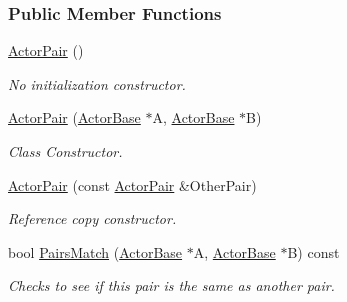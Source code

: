 \subsubsection*{Public Member Functions}
\begin{DoxyCompactItemize}
\item 
\hypertarget{classMezzanine_1_1ActorPair_a3dec652a633a16df9c97bf4a07cfa61d}{
\hyperlink{classMezzanine_1_1ActorPair_a3dec652a633a16df9c97bf4a07cfa61d}{ActorPair} ()}
\label{classMezzanine_1_1ActorPair_a3dec652a633a16df9c97bf4a07cfa61d}

\begin{DoxyCompactList}\small\item\em No initialization constructor. \item\end{DoxyCompactList}\item 
\hyperlink{classMezzanine_1_1ActorPair_a1225e33cabd53c5552ae7817e434080a}{ActorPair} (\hyperlink{classMezzanine_1_1ActorBase}{ActorBase} $\ast$A, \hyperlink{classMezzanine_1_1ActorBase}{ActorBase} $\ast$B)
\begin{DoxyCompactList}\small\item\em Class Constructor. \item\end{DoxyCompactList}\item 
\hyperlink{classMezzanine_1_1ActorPair_a79e10f448a82ff410a61f1d76cdb4edb}{ActorPair} (const \hyperlink{classMezzanine_1_1ActorPair}{ActorPair} \&OtherPair)
\begin{DoxyCompactList}\small\item\em Reference copy constructor. \item\end{DoxyCompactList}\item 
bool \hyperlink{classMezzanine_1_1ActorPair_a1d5f928bd8e88d6cf7be25c79e9fd529}{PairsMatch} (\hyperlink{classMezzanine_1_1ActorBase}{ActorBase} $\ast$A, \hyperlink{classMezzanine_1_1ActorBase}{ActorBase} $\ast$B) const 
\begin{DoxyCompactList}\small\item\em Checks to see if this pair is the same as another pair. \item\end{DoxyCompactList}\end{DoxyCompactItemize}
